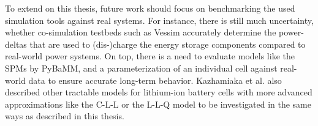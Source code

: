 To extend on this thesis, future work should focus on benchmarking the used simulation tools against real systems. For instance, there is still much uncertainty, whether co-simulation testbeds such as Vessim accurately determine the power-deltas that are used to (dis-)charge the energy storage components compared to real-world power systems. On top, there is a need to evaluate models like the SPMs by PyBaMM, and a parameterization of an individual cell against real-world data to ensure accurate long-term behavior. Kazhamiaka et al. \cite{kazhamiaka2019tractable} also described other tractable models for lithium-ion battery cells with more advanced approximations like the C-L-L or the L-L-Q model to be investigated in the same ways as described in this thesis.